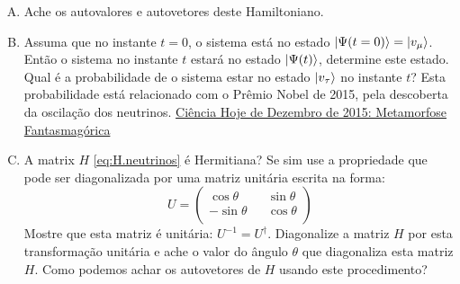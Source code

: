 \documentclass[a4paper, 12pt, notitlepage]{article}
\begin{document}
\begin{enumerate}
\begin{enumerate}[(A)]
  \item Ache os autovalores e autovetores deste Hamiltoniano.
  \item Assuma que no instante $t=0$, o sistema está no estado $\ket{\Psi(t = 0)} = \ket{v_\mu}$. Então o sistema no instante $t$ estará no estado $\ket{\Psi(t)}$, determine este estado. Qual é a probabilidade de o sistema estar no estado $\ket{v_\tau}$ no instante $t$?\linebreak
  Esta probabilidade está relacionado com o Prêmio Nobel de 2015, pela descoberta da oscilação dos neutrinos. \href{http://assinaturadigital.cienciahoje.org.br/revistas/reduzidas/332/files/assets/basic-html/index.html#1}{Ciência Hoje de Dezembro de 2015: Metamorfose Fantasmagórica}
  \item A matrix $H$ \eqref{eq:H.neutrinos} é Hermitiana? Se sim use a propriedade que pode ser diagonalizada por uma matriz unitária escrita na forma:
  \begin{equation}
  U = 
    \begin{pmatrix}
    \cos \theta && \sin \theta \\
    -\sin \theta && \cos \theta \\
    \end{pmatrix}
  \end{equation}
  Mostre que esta matriz é unitária: $U^{-1} = U^\dagger$.
  Diagonalize a matriz $H$ por esta transformação unitária e ache o valor do ângulo $\theta$ que diagonaliza esta matriz $H$. Como podemos achar os autovetores de $H$ usando este procedimento?
\end{enumerate}


\end{enumerate}
\end{document}
